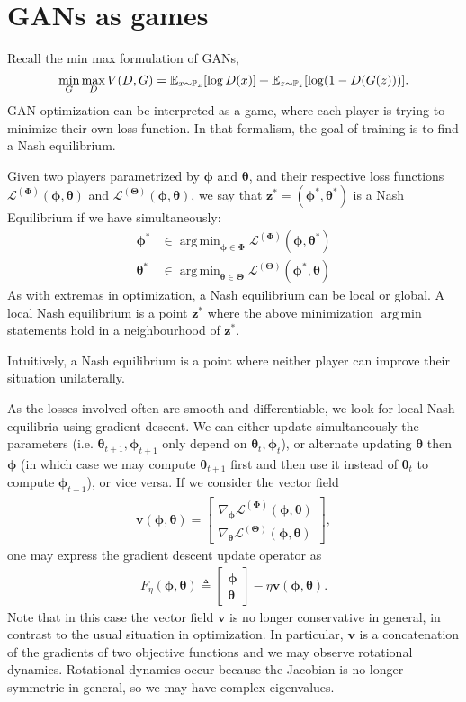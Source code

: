 \documentclass{article}
\DeclareMathOperator*{\argmin}{arg\,min}
\renewcommand{\vec}[1]{\ensuremath{\boldsymbol{#1}}}
\newcommand{\btheta}[0]{\ensuremath{\boldsymbol{\theta}}}
\newcommand{\bphi}[0]{\ensuremath{\boldsymbol{\phi}}}
\newcommand{\ltheta}[0]{\ensuremath{\mathcal{L}^{(\boldsymbol{\Theta})}}}
\newcommand{\lphi}[0]{\ensuremath{\mathcal{L}^{(\boldsymbol{\Phi})}}}
\newcommand{\phth}[0]{\ensuremath{(\boldsymbol{\phi}, \boldsymbol{\theta})}}
\begin{document}
\section{GANs as games}
Recall the min max formulation of GANs,
\begin{equation}\label{eq:gan}
    \min_G \max_D V(D, G) = \mathbb{E}_{x \sim \mathbb{P}_x} [\log D(x)] + \mathbb{E}_{z \sim \mathbb{P}_z} [\log (1-D(G(z)))].
\end{equation}
GAN optimization can be interpreted as a game, where each player is trying to minimize their own loss function. In that formalism, the goal of training is to find a Nash equilibrium.
\begin{defn}
    Given two players parametrized by $\bphi$ and $\btheta$, and their respective loss functions $\lphi \phth$ and $\ltheta \phth$, we say that $\vec{z^*} = (\bphi^*, \btheta^*)$ is a Nash Equilibrium if we have simultaneously:
    \begin{align}
        \bphi^* &\in \argmin_{\bphi\in \vec{\Phi}} \lphi (\bphi, \btheta^*) \nonumber \\
        \btheta^* &\in \argmin_{\btheta\in \vec{\Theta}} \ltheta (\bphi^*, \btheta)
    \end{align}
    As with extremas in optimization, a Nash equilibrium can be local or global. A local Nash equilibrium is a point $\vec{z}^*$ where the above minimization $\argmin$ statements hold in a neighbourhood of $\vec{z}^*$.
\end{defn}
Intuitively, a Nash equilibrium is a point where neither player can improve their situation unilaterally. \\
\par
As the losses involved often are smooth and differentiable, we look for local Nash equilibria using gradient descent. We can either update simultaneously the parameters (i.e. $\btheta_{t+1}, \bphi_{t+1}$ only depend on $\btheta_t, \bphi_t$), or alternate updating $\btheta$ then $\bphi$ (in which case we may compute $\btheta_{t+1}$ first and then use it instead of $\btheta_t$ to compute $\bphi_{t+1}$), or vice versa. If we consider the vector field
\begin{align}
    \vec{v}\phth = 
    \begin{bmatrix}
        \nabla_{\bphi} \lphi \phth \\
        \nabla_{\btheta} \ltheta \phth
    \end{bmatrix},
\end{align}
one may express the gradient descent update operator as 
\begin{align}
    F_\eta \phth \triangleq \begin{bmatrix}
        \bphi \\
        \btheta
    \end{bmatrix}
    - \eta \vec{v}\phth.
\end{align}
Note that in this case the vector field $\vec{v}$ is no longer conservative in general, in contrast to the usual situation in optimization. In particular, $\vec{v}$ is a concatenation of the gradients of two objective functions and we may observe rotational dynamics. Rotational dynamics occur because the Jacobian is no longer symmetric in general, so we may have complex eigenvalues.
\end{document}
